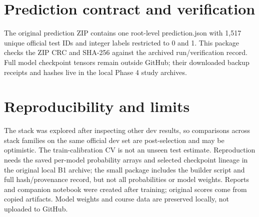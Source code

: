 \documentclass[11pt,a4paper]{article}
\begin{document}
\section{Prediction contract and verification}
The original prediction ZIP contains one root-level prediction.json with 1,517 unique official test IDs and integer labels restricted to 0 and 1. This package checks the ZIP CRC and SHA-256 against the archived run/verification record. Full model checkpoint tensors remain outside GitHub; their downloaded backup receipts and hashes live in the local Phase 4 study archives.
\section{Reproducibility and limits}
The stack was explored after inspecting other dev results, so comparisons across stack families on the same official dev set are post-selection and may be optimistic. The train-calibration CV is not an unseen test estimate. Reproduction needs the saved per-model probability arrays and selected checkpoint lineage in the original local B1 archive; the small package includes the builder script and full hash/provenance record, but not all probabilities or model weights. Reports and companion notebook were created after training; original scores come from copied artifacts. Model weights and course data are preserved locally, not uploaded to GitHub.
\end{document}
